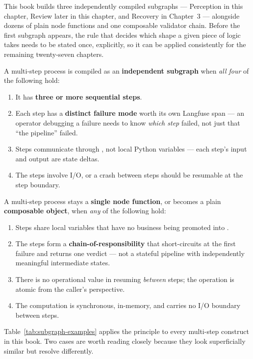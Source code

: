 This book builds three independently compiled subgraphs --- Perception in
this chapter, Review later in this chapter, and Recovery in Chapter~3 ---
alongside dozens of plain node functions and one composable validator
chain.  Before the first subgraph appears, the rule that decides which
shape a given piece of logic takes needs to be stated once, explicitly,
so it can be applied consistently for the remaining twenty-seven chapters.

\begin{takeawaybox}
A multi-step process is compiled as an \textbf{independent subgraph}
when \emph{all four} of the following hold:
\begin{enumerate}
  \item It has \textbf{three or more sequential steps}.
  \item Each step has a \textbf{distinct failure mode} worth its own
        Langfuse span --- an operator debugging a failure needs to know
        \emph{which step} failed, not just that ``the pipeline'' failed.
  \item Steps communicate through , not local Python
        variables --- each step's input and output are state deltas.
  \item The steps involve I/O, or a crash between steps should be
        resumable at the step boundary.
\end{enumerate}
A multi-step process stays a \textbf{single node function}, or becomes a
plain \textbf{composable object}, when \emph{any} of the following hold:
\begin{enumerate}
  \item Steps share local variables that have no business being
        promoted into .
  \item The steps form a \textbf{chain-of-responsibility} that
        short-circuits at the first failure and returns one verdict ---
        not a stateful pipeline with independently meaningful
        intermediate states.
  \item There is no operational value in resuming \emph{between} steps;
        the operation is atomic from the caller's perspective.
  \item The computation is synchronous, in-memory, and carries no I/O
        boundary between steps.
\end{enumerate}
\end{takeawaybox}

Table~\ref{tab:subgraph-examples} applies the principle to every
multi-step construct in this book.  Two cases are worth reading closely
because they look superficially similar but resolve differently.

